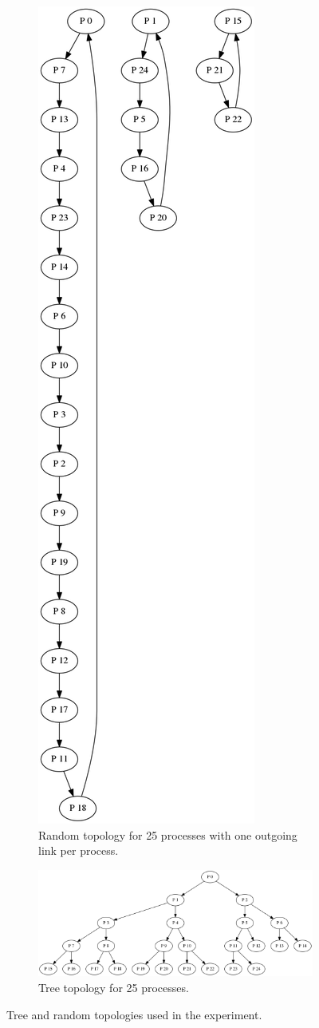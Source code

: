 \begin{figure}
    \centering
    \begin{subfigure}{0.5\textwidth}
    \centering
        \includegraphics[width=0.5\linewidth]{figures/random25.png}
        \caption{Random topology for 25 processes with one outgoing link per process.}
    \end{subfigure}%
    \begin{subfigure}{0.5\textwidth}
    \centering
        \includegraphics[width=0.5\linewidth]{figures/tree25.png}
        \caption{Tree topology for 25 processes.}
    \end{subfigure}
    \caption{Tree and random topologies used in the experiment.}
    \label{fig:experimenttopos}
    \end{figure}

